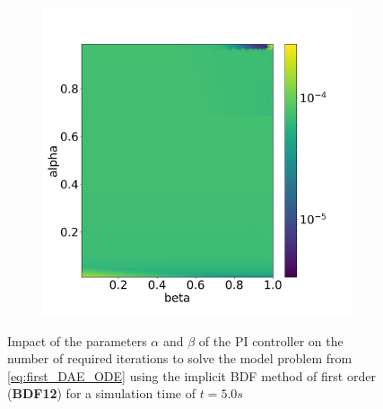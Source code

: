 \begin{figure}[H]
\begin{subfigure}{0.32\textwidth}
        \label{fig:numberIterationTSBDF12}
    \end{subfigure}
    \begin{subfigure}{0.32\textwidth}
    	\centering
    	\includegraphics[width=1\textwidth]{images/analysis_BDF12_psi.png}
        \label{fig:numberNumericalSchemeBDF12}
    \end{subfigure}
    \caption{Impact of the parameters $\alpha$ and $\beta$ of the PI controller on the number of required iterations to solve the model problem from \autoref{eq:first_DAE_ODE} using the implicit BDF method of first order (\textbf{BDF12}) for a simulation time of $t=5.0s$}
    \label{fig:ParametersPIControllerBDF12}
\end{figure}



